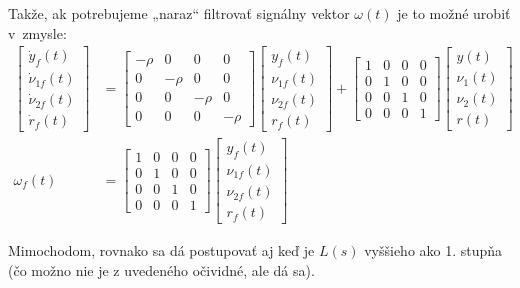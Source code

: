 \documentclass[a4paper, 10pt, ]{article}
\begin{document}
Takže, ak potrebujeme „naraz“ filtrovať signálny vektor $\omega(t)$ je to možné urobiť v~zmysle:
\begin{align}
    \begin{bmatrix}
        \dot y_f(t) \\ \dot \nu_{1f}(t) \\ \dot \nu_{2f}(t) \\ \dot r_f(t)
    \end{bmatrix}
    &=
    \begin{bmatrix}
        -\rho & 0 & 0 & 0 \\
        0 & -\rho & 0 & 0 \\
        0 & 0 & -\rho & 0 \\
        0 & 0 & 0 & -\rho
    \end{bmatrix}
    \begin{bmatrix}
        y_f(t) \\ \nu_{1f}(t) \\ \nu_{2f}(t) \\ r_f(t)
    \end{bmatrix}
    +
    \begin{bmatrix}
        1 & 0 & 0 & 0 \\
        0 & 1 & 0 & 0 \\
        0 & 0 & 1 & 0 \\
        0 & 0 & 0 & 1
    \end{bmatrix}
    \begin{bmatrix}
        y(t) \\ {\nu_1}(t) \\ {\nu_2}(t) \\ r(t)
    \end{bmatrix}
    \\
    \omega_f(t)
    &=
    \begin{bmatrix}
        1 & 0 & 0 & 0 \\
        0 & 1 & 0 & 0 \\
        0 & 0 & 1 & 0 \\
        0 & 0 & 0 & 1
    \end{bmatrix}
    \begin{bmatrix}
        y_f(t) \\ \nu_{1f}(t) \\ \nu_{2f}(t) \\ r_f(t)
    \end{bmatrix}
\end{align}

Mimochodom, rovnako sa dá postupovať aj keď je $L(s)$ vyššieho ako  1. stupňa (čo možno nie je z uvedeného očividné, ale dá sa).
\end{document}
